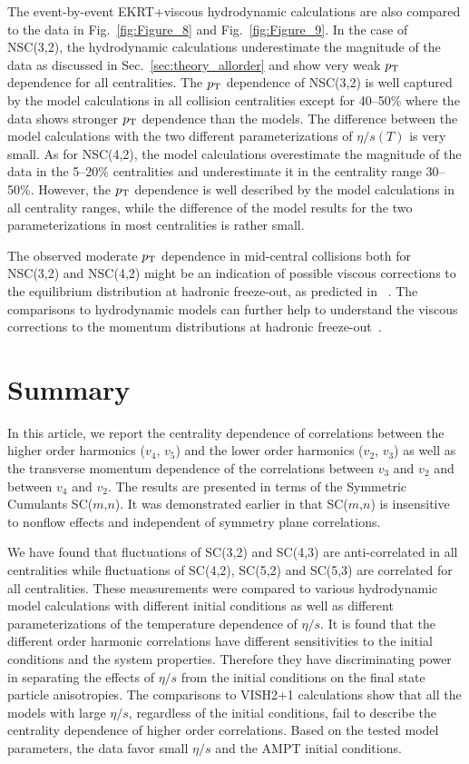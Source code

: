 The event-by-event EKRT+viscous hydrodynamic calculations are also compared to the data in Fig.~\ref{fig:Figure_8} and Fig.~\ref{fig:Figure_9}.
In the case of NSC(3,2), the hydrodynamic calculations underestimate the magnitude of the data as discussed in Sec.~\ref{sec:theory_allorder} and show very weak $p_{\rm T}$ dependence for all centralities.
The $p_{\rm T}$ dependence of NSC(3,2) is well captured by the model calculations in all collision centralities except for 40--50\% where the data shows stronger $p_{\rm T}$ dependence than the models. The difference between the model calculations with the two different parameterizations of $\eta/s(T)$ is very small. 
As for NSC(4,2), the model calculations overestimate the magnitude of the data in the 5--20\% centralities and underestimate it in the centrality range 30--50\%. However, the $p_{\rm T}$ dependence is well described by the model calculations in all centrality ranges, while the difference of the model results for the two parameterizations in most centralities is rather small.

The observed moderate $p_{\rm T}$ dependence in mid-central collisions both for NSC(3,2) and NSC(4,2) might be an indication of possible viscous corrections to the equilibrium distribution at hadronic freeze-out, as predicted in ~\cite{Niemi:2012aj}.
The comparisons to hydrodynamic models can further help to understand the viscous corrections to the momentum distributions at hadronic freeze-out~\cite{Dusling:2009df,Luzum:2010ad,Teaney:2012ke,Molnar:2014fva,Niemi:2015qia}.
 
\section{Summary}
\label{sec:summary}
In this article, we report the centrality dependence of correlations between the higher order harmonics ($v_4$, $v_5$) and the lower order harmonics ($v_2$, $v_3$) as well as the transverse momentum dependence of the correlations between $v_3$ and $v_2$ and between $v_4$ and $v_2$.
The results are presented in terms of the Symmetric Cumulants SC($m$,$n$). It was demonstrated earlier in \cite{ALICE:2016kpq} that SC($m$,$n$) is insensitive to nonflow effects and independent of symmetry plane correlations.

We have found that fluctuations of SC(3,2) and SC(4,3) are anti-correlated in all centralities while fluctuations of SC(4,2), SC(5,2) and SC(5,3) are correlated for all centralities. 
These measurements were compared to various hydrodynamic model calculations with different initial conditions as well as different parameterizations of the temperature dependence of $\eta/s$.
It is found that the different order harmonic correlations have different sensitivities to the initial conditions and the system properties. Therefore they have discriminating power in separating the effects of $\eta/s$  from the initial conditions on the final state particle anisotropies.
The comparisons to VISH2+1 calculations show that all the models with large $\eta/s$, regardless of the initial conditions, fail to describe the centrality dependence of higher order correlations. 
Based on the tested model parameters, the data favor small $\eta/s$ and the AMPT initial conditions. 

